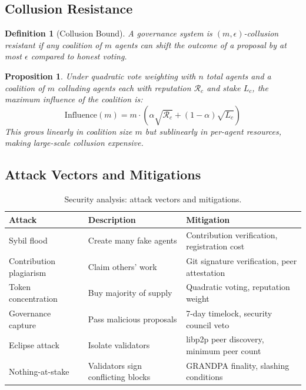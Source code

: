 \documentclass{article}
\newtheorem{proposition}[theorem]{Proposition}
\newtheorem{definition}{Definition}
\begin{document}
\subsection{Collusion Resistance}

\begin{definition}[Collusion Bound]
A governance system is $(m, \epsilon)$-collusion resistant if any coalition of $m$ agents can shift the outcome of a proposal by at most $\epsilon$ compared to honest voting.
\end{definition}

\begin{proposition}
Under quadratic vote weighting with $n$ total agents and a coalition of $m$ colluding agents each with reputation $\mathcal{R}_c$ and stake $L_c$, the maximum influence of the coalition is:
\begin{equation}
    \text{Influence}(m) = m \cdot (\alpha\sqrt{\mathcal{R}_c} + (1-\alpha)\sqrt{L_c})
\end{equation}
This grows linearly in coalition size $m$ but sublinearly in per-agent resources, making large-scale collusion expensive.
\end{proposition}

\subsection{Attack Vectors and Mitigations}

\begin{table}[t]
\centering
\small
\begin{tabular}{p{2.5cm}p{4cm}p{5cm}}
\toprule
\textbf{Attack} & \textbf{Description} & \textbf{Mitigation} \\
\midrule
Sybil flood & Create many fake agents & Contribution verification, registration cost \\
Contribution plagiarism & Claim others' work & Git signature verification, peer attestation \\
Token concentration & Buy majority of supply & Quadratic voting, reputation weight \\
Governance capture & Pass malicious proposals & 7-day timelock, security council veto \\
Eclipse attack & Isolate validators & libp2p peer discovery, minimum peer count \\
Nothing-at-stake & Validators sign conflicting blocks & GRANDPA finality, slashing conditions \\
\bottomrule
\end{tabular}
\caption{Security analysis: attack vectors and mitigations.}
\label{tab:attacks}
\end{table}
\end{document}
